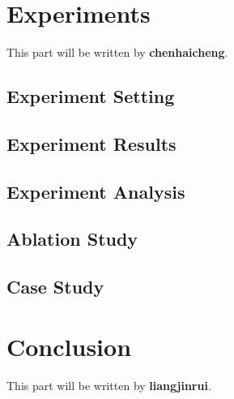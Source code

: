 \documentclass{article}
\begin{document}
\section{Experiments}

This part will be written by {\bf chenhaicheng}.
\subsection{Experiment Setting}
\subsection{Experiment Results}
\subsection{Experiment Analysis}
\subsection{Ablation Study}
\subsection{Case Study}

\section{Conclusion}
This part will be written by {\bf liangjinrui}.

\newpage


\end{document}
